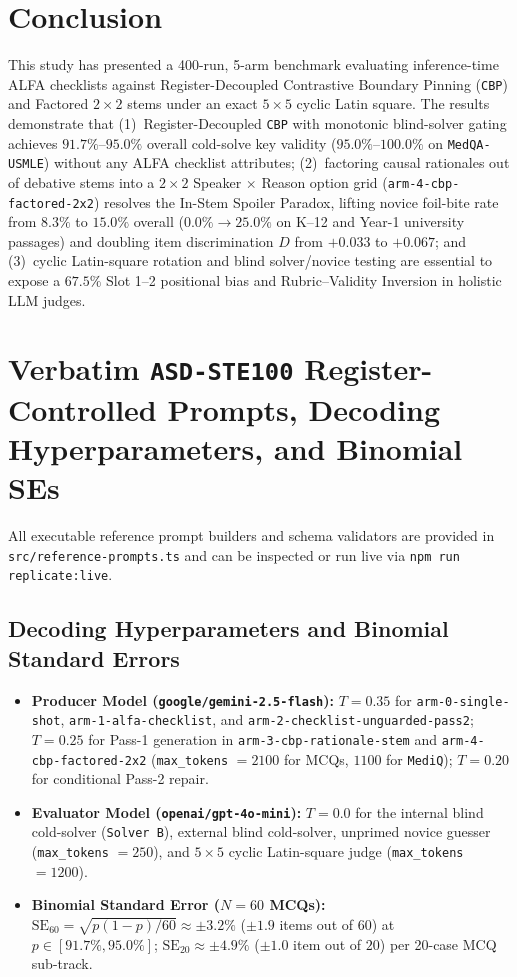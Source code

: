 \documentclass[11pt,a4paper]{article}
\begin{document}
\section{Conclusion}
This study has presented a 400-run, 5-arm benchmark evaluating inference-time ALFA checklists against Register-Decoupled Contrastive Boundary Pinning (\texttt{CBP}) and Factored $2\times 2$ stems under an exact $5\times 5$ cyclic Latin square. The results demonstrate that (1)~Register-Decoupled \texttt{CBP} with monotonic blind-solver gating achieves $91.7\%$--$95.0\%$ overall cold-solve key validity ($95.0\%$--$100.0\%$ on \texttt{MedQA-USMLE}) without any ALFA checklist attributes; (2)~factoring causal rationales out of debative stems into a $2\times 2$ Speaker $\times$ Reason option grid (\texttt{arm-4-cbp-factored-2x2}) resolves the In-Stem Spoiler Paradox, lifting novice foil-bite rate from $8.3\%$ to $15.0\%$ overall ($0.0\% \to 25.0\%$ on K--12 and Year-1 university passages) and doubling item discrimination $D$ from $+0.033$ to $+0.067$; and (3)~cyclic Latin-square rotation and blind solver/novice testing are essential to expose a $67.5\%$ Slot 1--2 positional bias and Rubric--Validity Inversion in holistic LLM judges.

\appendix
\section{Verbatim \texttt{ASD-STE100} Register-Controlled Prompts, Decoding Hyperparameters, and Binomial SEs}
\label{app:prompts}

All executable reference prompt builders and schema validators are provided in \texttt{src/reference-prompts.ts} and can be inspected or run live via \texttt{npm run replicate:live}.

\subsection{Decoding Hyperparameters and Binomial Standard Errors}
\begin{itemize}
  \item \textbf{Producer Model (\texttt{google/gemini-2.5-flash}):} $T = 0.35$ for \texttt{arm-0-single-shot}, \texttt{arm-1-alfa-checklist}, and \texttt{arm-2-checklist-unguarded-pass2}; $T = 0.25$ for Pass-1 generation in \texttt{arm-3-cbp-rationale-stem} and \texttt{arm-4-cbp-factored-2x2} (\texttt{max\_tokens} $= 2100$ for MCQs, $1100$ for \texttt{MediQ}); $T = 0.20$ for conditional Pass-2 repair.
  \item \textbf{Evaluator Model (\texttt{openai/gpt-4o-mini}):} $T = 0.0$ for the internal blind cold-solver (\texttt{Solver B}), external blind cold-solver, unprimed novice guesser (\texttt{max\_tokens} $= 250$), and $5\times 5$ cyclic Latin-square judge (\texttt{max\_tokens} $= 1200$).
  \item \textbf{Binomial Standard Error ($N=60$ MCQs):} $\text{SE}_{60} = \sqrt{p(1-p)/60} \approx \pm 3.2\%$ ($\pm 1.9$ items out of $60$) at $p \in [91.7\%, 95.0\%]$; $\text{SE}_{20} \approx \pm 4.9\%$ ($\pm 1.0$ item out of $20$) per 20-case MCQ sub-track.
\end{itemize}
\end{document}
